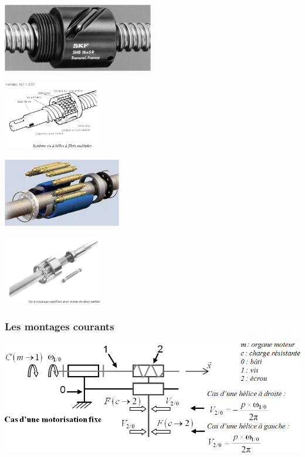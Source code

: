 \documentclass[11pt,oneside]{article}
\begin{document}
\begin{minipage}[c]{.45\linewidth}
\begin{center}
\includegraphics[height=3cm]{png/fig_97}

\includegraphics[height=3cm]{png/fig_98}
\end{center}
\end{minipage} \hfill
\begin{minipage}[c]{.45\linewidth}
\begin{center}
\includegraphics[height=3cm]{png/fig_99}

\includegraphics[height=3cm]{png/fig_100}
\end{center}
\end{minipage}

\subsubsection{Les montages courants}

\begin{center}
\includegraphics[width=.8\textwidth]{png/fig_101}
\end{center}
\end{document}
